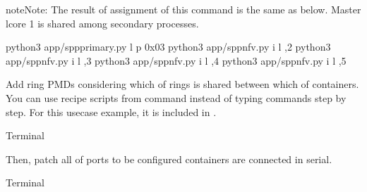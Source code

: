 \documentclass[a4paper,11pt,openany,oneside,english]{sphinxmanual}
\begin{document}
\begin{sphinxadmonition}{note}{Note:}
The result of assignment of this command is the same as below.
Master lcore 1 is shared among secondary processes.

\begin{sphinxVerbatim}[commandchars=\\\{\},formatcom=\footnotesize]
 python3 app/spp\PYGZhy{}primary.py \PYGZhy{}l  \PYGZhy{}p 0x03
 python3 app/spp\PYGZhy{}nfv.py \PYGZhy{}i  \PYGZhy{}l ,2
 python3 app/spp\PYGZhy{}nfv.py \PYGZhy{}i  \PYGZhy{}l ,3
 python3 app/spp\PYGZhy{}nfv.py \PYGZhy{}i  \PYGZhy{}l ,4
 python3 app/spp\PYGZhy{}nfv.py \PYGZhy{}i  \PYGZhy{}l ,5
\end{sphinxVerbatim}
\end{sphinxadmonition}

Add ring PMDs considering which of rings is shared between which of
containers.
You can use recipe scripts from  command instead of
typing commands step by step.
For this usecase example, it is included in
.

\begin{sphinxVerbatim}[commandchars=\\\{\},formatcom=\footnotesize]
 Terminal 
\end{sphinxVerbatim}

Then, patch all of ports to be configured containers are connected
in serial.

\begin{sphinxVerbatim}[commandchars=\\\{\},formatcom=\footnotesize]
 Terminal 
\end{sphinxVerbatim}
\end{document}
